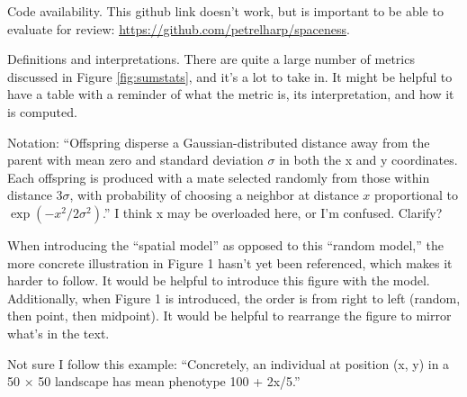 \begin{point}{}
    Code availability. This github link doesn't work, but is important to be able to evaluate for review: \url{https://github.com/petrelharp/spaceness}.
\end{point}


\begin{point}{}
    Definitions and interpretations. There are quite a large number of metrics discussed in Figure \ref{fig:sumstats}, and it's a lot to take in. It might be helpful to have a table with a reminder of what the metric is, its interpretation, and how it is computed.
\end{point}


\begin{point}{\revref}
    Notation: ``Offspring disperse a Gaussian-distributed distance away from the parent with mean zero and standard deviation $\sigma$ in both the x and y coordinates. Each offspring is produced with a mate selected randomly from those within distance $3\sigma$, with probability of choosing a neighbor at distance $x$ proportional to $\exp(-x^2/2\sigma^2)$.'' I think x may be overloaded here, or I'm confused. Clarify?
\end{point}


\begin{point}{}
    When introducing the ``spatial model'' as opposed to this ``random model,'' the more concrete illustration in Figure 1 hasn't yet been referenced, which makes it harder to follow. It would be helpful to introduce this figure with the model. Additionally, when Figure 1 is introduced, the order is from right to left (random, then point, then midpoint). It would be helpful to rearrange the figure to mirror what's in the text.
\end{point}


\begin{point}{\revref}
    Not sure I follow this example: ``Concretely, an individual at position (x, y) in a 50 × 50 landscape has mean phenotype 100 + 2x/5.''
\end{point}

